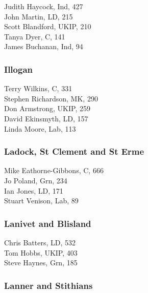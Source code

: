 \documentclass[a4paper,openany,10pt]{book}
\begin{document}


Judith Haycock, Ind, 427\\
John Martin, LD, 215\\
Scott Blandford, UKIP, 210\\
Tanya Dyer, C, 141\\
James Buchanan, Ind, 94\\


\subsubsection*{Illogan}



Terry Wilkins, C, 331\\
Stephen Richardson, MK, 290\\
Don Armstrong, UKIP, 259\\
David Ekinsmyth, LD, 157\\
Linda Moore, Lab, 113\\


\subsubsection*{Ladock, St Clement and St Erme}



Mike Eathorne-Gibbons, C, 666\\
Jo Poland, Grn, 234\\
Ian Jones, LD, 171\\
Stuart Venison, Lab, 89\\


\subsubsection*{Lanivet and Blisland}



Chris Batters, LD, 532\\
Tom Hobbs, UKIP, 403\\
Steve Haynes, Grn, 185\\


\subsubsection*{Lanner and Stithians}
\end{document}
